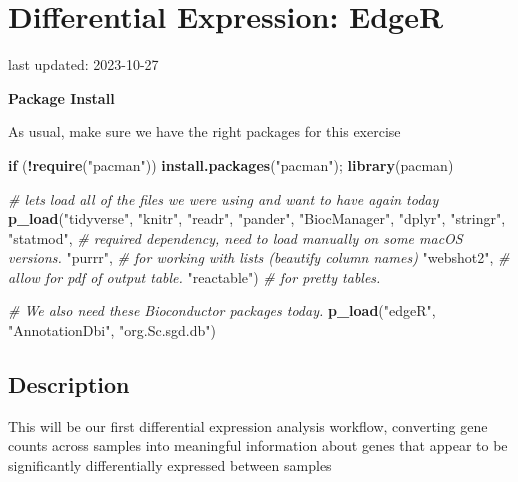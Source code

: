 \documentclass[
]{book}
\newenvironment{Shaded}{\begin{snugshade}}{\end{snugshade}}
\newcommand{\CommentTok}[1]{\textcolor[rgb]{0.56,0.35,0.01}{\textit{#1}}}
\newcommand{\ControlFlowTok}[1]{\textcolor[rgb]{0.13,0.29,0.53}{\textbf{#1}}}
\newcommand{\FunctionTok}[1]{\textcolor[rgb]{0.13,0.29,0.53}{\textbf{#1}}}
\newcommand{\NormalTok}[1]{#1}
\newcommand{\SpecialCharTok}[1]{\textcolor[rgb]{0.81,0.36,0.00}{\textbf{#1}}}
\newcommand{\StringTok}[1]{\textcolor[rgb]{0.31,0.60,0.02}{#1}}
\begin{document}
\hypertarget{differential-expression-edger}{%
\chapter{Differential Expression: EdgeR}\label{differential-expression-edger}}

last updated: 2023-10-27

\textbf{Package Install}

As usual, make sure we have the right packages for this exercise

\begin{Shaded}
\begin{Highlighting}[]
\ControlFlowTok{if}\NormalTok{ (}\SpecialCharTok{!}\FunctionTok{require}\NormalTok{(}\StringTok{"pacman"}\NormalTok{)) }\FunctionTok{install.packages}\NormalTok{(}\StringTok{"pacman"}\NormalTok{); }\FunctionTok{library}\NormalTok{(pacman)}

\CommentTok{\# let\textquotesingle{}s load all of the files we were using and want to have again today}
\FunctionTok{p\_load}\NormalTok{(}\StringTok{"tidyverse"}\NormalTok{, }\StringTok{"knitr"}\NormalTok{, }\StringTok{"readr"}\NormalTok{,}
       \StringTok{"pander"}\NormalTok{, }\StringTok{"BiocManager"}\NormalTok{, }
       \StringTok{"dplyr"}\NormalTok{, }\StringTok{"stringr"}\NormalTok{, }
       \StringTok{"statmod"}\NormalTok{, }\CommentTok{\# required dependency, need to load manually on some macOS versions.}
       \StringTok{"purrr"}\NormalTok{, }\CommentTok{\# for working with lists (beautify column names)}
       \StringTok{"webshot2"}\NormalTok{, }\CommentTok{\# allow for pdf of output table.}
       \StringTok{"reactable"}\NormalTok{) }\CommentTok{\# for pretty tables.}

\CommentTok{\# We also need these Bioconductor packages today.}
\FunctionTok{p\_load}\NormalTok{(}\StringTok{"edgeR"}\NormalTok{, }\StringTok{"AnnotationDbi"}\NormalTok{, }\StringTok{"org.Sc.sgd.db"}\NormalTok{)}
\end{Highlighting}
\end{Shaded}

\hypertarget{description-2}{%
\section{Description}\label{description-2}}

This will be our first differential expression analysis workflow,
converting gene counts across samples into meaningful information about
genes that appear to be significantly differentially expressed between
samples
\end{document}

